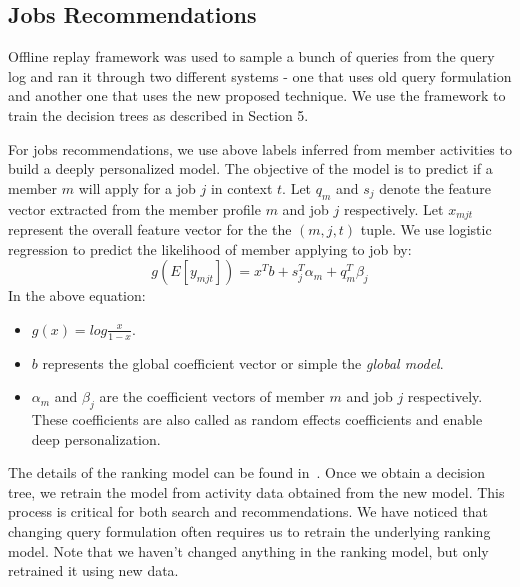 
\subsection{Jobs Recommendations}


Offline replay framework was used to sample a bunch of queries from the query
log and ran it through two different systems - one that uses old query
formulation and another one that uses the new proposed technique. 
We use the framework to train the decision trees as described in Section 5.  

For jobs recommendations, we use above labels inferred from member activities 
to build a deeply personalized
model. The objective of the model is to predict if a member $m$ will apply for
a job $j$ in context $t$. Let $q_m$ and $s_j$ denote the feature vector 
extracted from the member profile $m$ and job $j$ respectively. Let $x_{mjt}$
represent the overall feature vector for the the $(m, j, t)$ tuple. We use
logistic regression to predict the likelihood of member applying to job by:
\begin{equation} \label{eqn:glmix}
    g(E[y_{mjt}]) = x^{T}b + s^{T}_{j}\alpha_{m} + q^{T}_{m}\beta_{j}
\end{equation}
In the above equation:
\begin{itemize}
        \item $g(x) = log\frac{x}{1-x}$.
        \item  $b$ represents the global coefficient vector or simple the {\it
            global model}.
        \item $\alpha_m$ and $\beta_j$ are the coefficient vectors of member
            $m$ and job $j$ respectively. These coefficients are also called as
            random effects coefficients and enable deep personalization.

\end{itemize}
The details of the ranking model can be found in~\cite{zhang2016glmix}. Once we
obtain a decision tree, we retrain the model from activity data obtained from
the new model. This process is critical for both search and recommendations. We
have noticed that changing query formulation often requires us to retrain the
underlying ranking model. Note that we haven't changed anything in the ranking
model, but only retrained it using new data.

